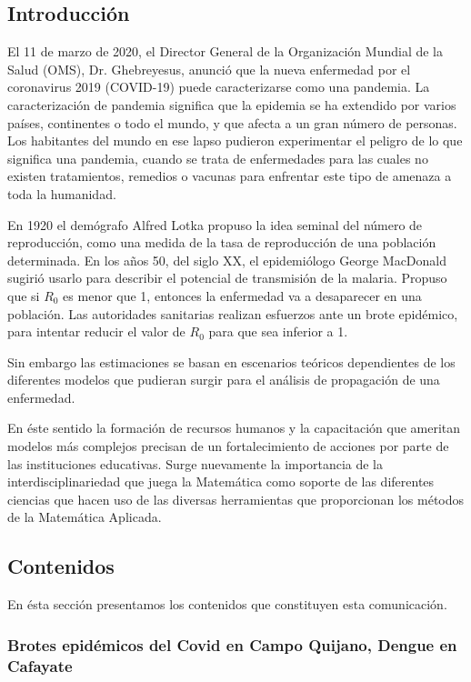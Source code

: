 \subsection{Introducción}

El 11 de marzo de 2020, el Director General de la Organización Mundial de la Salud (OMS), Dr. Ghebreyesus, anunció que la nueva enfermedad por el coronavirus 2019 (COVID-19) puede caracterizarse como una pandemia. La caracterización de pandemia significa que la epidemia se ha extendido por varios países, continentes o todo el mundo, y que afecta a un gran número de personas. Los habitantes del mundo en ese lapso pudieron experimentar el peligro de lo que significa una pandemia, cuando se trata de enfermedades para las cuales no existen tratamientos, remedios o vacunas para enfrentar este tipo de amenaza a toda la humanidad.

En 1920 el demógrafo Alfred Lotka propuso la idea seminal del número de reproducción, como una medida de la tasa de reproducción de una población determinada. En los años 50, del siglo XX, el epidemiólogo George MacDonald sugirió usarlo para describir el potencial de transmisión de la malaria. Propuso que si $R_0$ es menor que 1, entonces la enfermedad va a desaparecer en una población. Las autoridades sanitarias realizan esfuerzos ante un brote epidémico, para intentar reducir el valor de $R_0$ para que sea inferior a 1.

Sin embargo las estimaciones se basan en escenarios teóricos dependientes de los diferentes modelos que pudieran surgir para el análisis de propagación de una enfermedad.

En éste sentido la formación de recursos humanos y la capacitación que ameritan modelos más complejos precisan de un fortalecimiento de acciones por parte de las instituciones educativas. Surge nuevamente la importancia de la interdisciplinariedad que juega la Matemática como soporte de las diferentes ciencias que hacen uso de las diversas herramientas que proporcionan los métodos de la Matemática Aplicada.

\subsection{Contenidos}

En ésta sección presentamos los contenidos que constituyen esta comunicación.

\subsubsection{Brotes epidémicos del Covid en Campo Quijano, Dengue en Cafayate}

